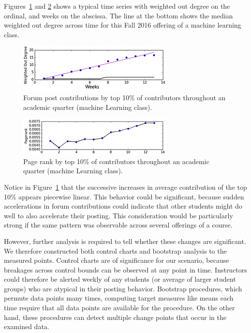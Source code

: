 Figures~\ref{fig:cs229OutDeg} and \ref{fig:cs229PageRank} shows a
typical time series with weighted out degree on the ordinal, and weeks
on the abscissa. The line at the bottom shows the median weighted out
degree across time for this Fall 2016 offering of a machine learning
class.
\begin{figure}[htp]
       \centering
       \includegraphics{Figs/comparison_Weighted_Out_Degree_fall16SimplifiedSmall.png}
       \caption{\textnormal{Forum post contributions by top 10\% of
           contributors throughout an academic quarter (machine Learning class).}}
       \label{fig:cs229OutDeg}
\end{figure}
\begin{figure}[htp]
       \centering
       \includegraphics{Figs/comparison_Pagerank_fall16CS229Tiny.png}
       \caption{\textnormal{Page rank by top 10\% of
           contributors throughout an academic quarter (machine Learning class).}}
       \label{fig:cs229PageRank}
\end{figure}
Notice in Figure~\ref{fig:cs229OutDeg} that the successive increases
in average contribution of the top 10\% appears piecewise
linear. This behavior could be significant, because sudden
accelerations in forum contributions could indicate that other
students might do well to also accelerate their posting. This
consideration would be particularly strong if the same pattern was
observable across several offerings of a course.

However, further analysis is required to tell whether these changes
are significant. We therefore constructed both control charts and
bootstrap analysis to the measured points. Control charts are of
significance for our scenario, because breakages across control bounds
can be observed at any point in time. Instructors could therefore be
alerted weekly of any students (or average of larger student groups)
who are atypical in their posting behavior. Bootstrap procedures,
which permute data points many times, computing target measures like
means each time require that all data points are available for the
procedure. On the other hand, these procedures can detect multiple
change points that occur in the examined data.

